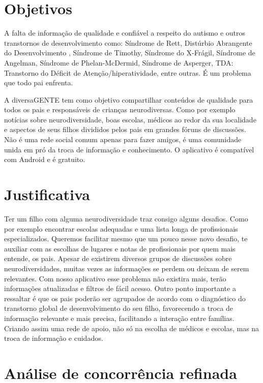 \section{Objetivos}

A falta de informação de qualidade e confiável a respeito do autismo e outros transtornos de desenvolvimento como: Síndrome de Rett, Distúrbio Abrangente do Desenvolvimento , Síndrome de Timothy, Síndrome do X-Frágil, Síndrome de Angelman, Síndrome de Phelan-McDermid, Síndrome de Asperger, TDA: Transtorno do Déficit de Atenção/hiperatividade, entre outras. É um problema que todo pai enfrenta.


A diversaGENTE tem como objetivo compartilhar conteúdos de qualidade para todos os pais e responsáveis de crianças neurodiversas. Como por exemplo notícias sobre neurodiversidade, boas escolas, médicos ao redor da sua localidade e aspectos de seus filhos divididos pelos pais em grandes fóruns de discussões. Não é uma rede social comum apenas para fazer amigos, é uma comunidade unida em pró da troca de informação e conhecimento.
O aplicativo é compatível com Android e é gratuito.

\section{Justificativa}

Ter um filho com alguma neurodiversidade traz consigo alguns desafios. Como por exemplo encontrar escolas adequadas e uma lista longa de profissionais especializados. Queremos facilitar mesmo que um pouco nesse novo desafio, te auxiliar com as escolhas de lugares e notas de profissionais por quem mais entende, os pais. Apesar de existirem diversos grupos de discussões sobre neurodiversidades, muitas vezes as informações se perdem ou deixam de serem relevantes. Com nosso aplicativo esse problema não existira mais, terão informações atualizadas e filtros de fácil acesso.
Outro ponto importante a ressaltar é que os pais poderão ser agrupados de acordo com o diagnóstico do transtorno global de desenvolvimento do seu filho, favorecendo a troca de informação relevante e mais precisa, facilitando a interação entre famílias.
Criando assim uma rede de apoio, não só na escolha de médicos e escolas, mas na troca de informação e cuidados.

\pagebreak

\section{Análise de concorrência refinada}

